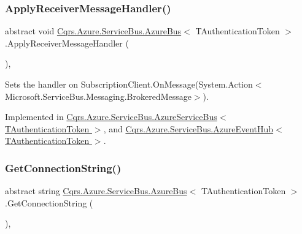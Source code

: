 \subsubsection{\texorpdfstring{Apply\+Receiver\+Message\+Handler()}{ApplyReceiverMessageHandler()}}
{\footnotesize\ttfamily abstract void \hyperlink{classCqrs_1_1Azure_1_1ServiceBus_1_1AzureBus}{Cqrs.\+Azure.\+Service\+Bus.\+Azure\+Bus}$<$ T\+Authentication\+Token $>$.Apply\+Receiver\+Message\+Handler (\begin{DoxyParamCaption}{ }\end{DoxyParamCaption})\hspace{0.3cm}{\ttfamily [protected]}, {}}



Sets the handler on Subscription\+Client.\+On\+Message(\+System.\+Action$<$\+Microsoft.\+Service\+Bus.\+Messaging.\+Brokered\+Message$>$). 



Implemented in \hyperlink{classCqrs_1_1Azure_1_1ServiceBus_1_1AzureServiceBus_a6ea94560e02fce0d920c467062f5fc98_a6ea94560e02fce0d920c467062f5fc98}{Cqrs.\+Azure.\+Service\+Bus.\+Azure\+Service\+Bus$<$ T\+Authentication\+Token $>$}, and \hyperlink{classCqrs_1_1Azure_1_1ServiceBus_1_1AzureEventHub_af2efc497815828b6fe0b4d6621bc8b41_af2efc497815828b6fe0b4d6621bc8b41}{Cqrs.\+Azure.\+Service\+Bus.\+Azure\+Event\+Hub$<$ T\+Authentication\+Token $>$}.

\mbox{\label{classCqrs_1_1Azure_1_1ServiceBus_1_1AzureBus_a514e371d5ce093678365af31e6c274e3_a514e371d5ce093678365af31e6c274e3}} 
\subsubsection{\texorpdfstring{Get\+Connection\+String()}{GetConnectionString()}}
{\footnotesize\ttfamily abstract string \hyperlink{classCqrs_1_1Azure_1_1ServiceBus_1_1AzureBus}{Cqrs.\+Azure.\+Service\+Bus.\+Azure\+Bus}$<$ T\+Authentication\+Token $>$.Get\+Connection\+String (\begin{DoxyParamCaption}{ }\end{DoxyParamCaption})\hspace{0.3cm}{\ttfamily [protected]}, {}}



